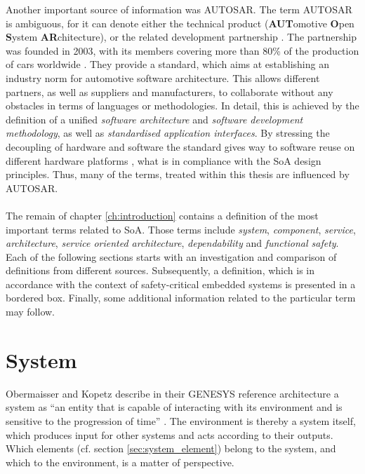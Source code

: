 Another important source of information was AUTOSAR. The term AUTOSAR is ambiguous, for it can denote either the technical product (\textbf{AUT}omotive \textbf{O}pen \textbf{S}ystem \textbf{AR}chitecture), or the related development partnership \cite{autosar_rs_main}. The partnership was founded in 2003, with its members covering more than 80\% of the production of cars worldwide \cite{kirschke_biller2011} \cite{schmerler2012}. They provide a standard, which aims at establishing an industry norm for automotive software architecture. This allows different partners, as well as suppliers and manufacturers, to collaborate without any obstacles in terms of languages or methodologies. In detail, this is achieved by the definition of a unified \emph{software architecture} and \emph{software development methodology}, as well as \emph{standardised application interfaces}. By stressing the decoupling of hardware and software the standard gives way to software reuse on different hardware platforms \cite{kirschke_biller2011} \cite{schmerler2012}, what is in compliance with the SoA design principles. Thus, many of the terms, treated within this thesis are influenced by AUTOSAR.
\\
\\
The remain of chapter \ref{ch:introduction} contains a definition of the most important terms related to SoA. Those terms include \emph{system}, \emph{component}, \emph{service}, \emph{architecture}, \emph{service oriented architecture}, \emph{dependability} and \emph{functional safety}. Each of the following sections starts with an investigation and comparison of definitions from different sources. Subsequently, a definition, which is in accordance with the context of safety-critical embedded systems is presented in a bordered box. Finally, some additional information related to the particular term may follow.






\section{System}
\label{ch:system}
Obermaisser and Kopetz describe in their GENESYS reference architecture a system as ``an entity that is capable of interacting with its environment and is sensitive to the progression of time'' \cite[p.7]{genesys}. The environment is thereby a system itself, which produces input for other systems and acts according to their outputs. Which elements (cf. section \ref{sec:system_element}) belong to the system, and which to the environment, is a matter of perspective. 

